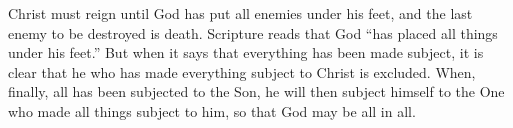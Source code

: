 \lettrine[lines=3]{C}{}hrist must reign until God has put all enemies under his feet, and the last enemy to be destroyed is death. Scripture reads that God “has placed all things under his feet.” But when it says that everything has been made subject, it is clear that he who has made everything subject to Christ is excluded. When, finally, all has been subjected to the Son, he will then subject himself to the One who made all things subject to him, so that God may be all in all.